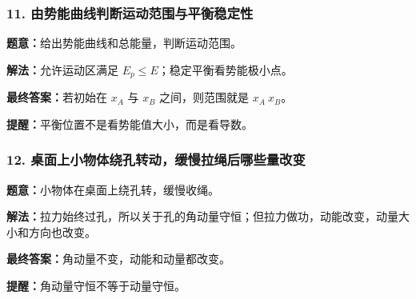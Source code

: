 \documentclass[12pt,a4paper]{ctexart}
\begin{document}
\subsubsection*{11. 由势能曲线判断运动范围与平衡稳定性}
\begin{tcolorbox}[colback=gray!2!white,colframe=black!60,title={题目}]
\textbf{题意：}给出势能曲线和总能量，判断运动范围。\par
\end{tcolorbox}
\begin{tcolorbox}[colback=blue!2!white,colframe=blue!55!black,title={完整答案}]
\textbf{解法：}允许运动区满足 \(E_p≤E\)；稳定平衡看势能极小点。\par
\textbf{最终答案：}若初始在 \(x_A\) 与 \(x_B\) 之间，则范围就是 \(x_A~x_B\)。\par

\end{tcolorbox}
\begin{tcolorbox}[colback=red!2!white,colframe=red!55!black,title={易错点}]
\textbf{提醒：}平衡位置不是看势能值大小，而是看导数。\par
\end{tcolorbox}

\subsubsection*{12. 桌面上小物体绕孔转动，缓慢拉绳后哪些量改变}
\begin{tcolorbox}[colback=gray!2!white,colframe=black!60,title={题目}]
\textbf{题意：}小物体在桌面上绕孔转，缓慢收绳。\par
\end{tcolorbox}
\begin{tcolorbox}[colback=blue!2!white,colframe=blue!55!black,title={完整答案}]
\textbf{解法：}拉力始终过孔，所以关于孔的角动量守恒；但拉力做功，动能改变，动量大小和方向也改变。\par
\textbf{最终答案：}角动量不变，动能和动量都改变。\par

\end{tcolorbox}
\begin{tcolorbox}[colback=red!2!white,colframe=red!55!black,title={易错点}]
\textbf{提醒：}角动量守恒不等于动量守恒。\par
\end{tcolorbox}
\end{document}
